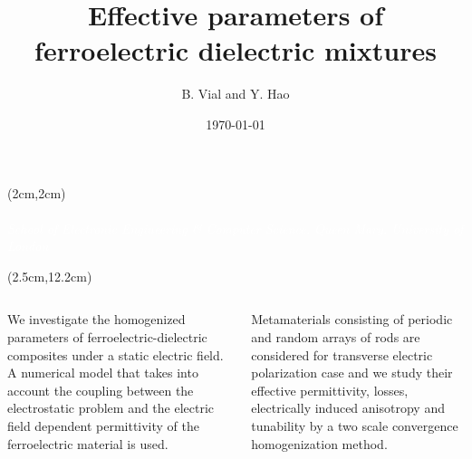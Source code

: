 \documentclass[final,12pt]{beamer} %
\begin{document}
\color{fresnelblack}
\date{\today}
\title{Effective parameters of ferroelectric dielectric mixtures}
\subtitle{}
\author{B. Vial and Y. Hao }

\begin{frame}


\begin{textblock*}{80cm}(2cm,2cm)
{\hfill \blackfont\fontsize{1.9cm}{1em}\selectfont \textcolor{fresnelorange}{\MakeUppercase{\inserttitle}}\\}\vspace*{2em}
{\hfill \textcolor{white}{\Large\insertauthor}\\}
\vspace*{16pt}
{\hfill \itshape\large\textcolor{white}{
School of Electronic Engineering \& Computer Science, Queen Mary, University of London}}
\end{textblock*}


\begin{textblock*}{79.5cm}(2.5cm,12.2cm)
{ \vspace{0.5em}
  \large \itshape
  \begin{columns}[t,totalwidth=\columnwidth]

  \begin{column}{.48\columnwidth}
    We investigate the homogenized parameters of ferroelectric-dielectric composites under a static electric field. A numerical model that takes into account the coupling
    between the electrostatic problem and the electric field dependent permittivity of the
    ferroelectric material is used.
  \end{column}

  \begin{column}{.48\columnwidth}
    Metamaterials consisting of periodic and random arrays of rods
      are considered for transverse electric polarization case
      and we study their effective permittivity, losses, electrically induced anisotropy
      and tunability by a two scale convergence homogenization method.
  \end{column}

\end{columns}

}
\end{textblock*}
\end{frame}
\end{document}
